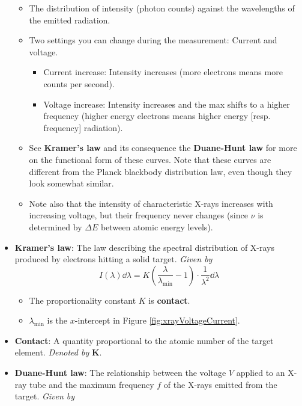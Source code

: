 \documentclass[../notes.tex]{subfiles}
\begin{document}
\begin{itemize}
\begin{itemize}
        \item The distribution of intensity (photon counts) against the wavelengths of the emitted radiation.
        \item Two settings you can change during the measurement: Current and voltage.
        \begin{itemize}
            \item Current increase: Intensity increases (more electrons means more counts per second).
            \item Voltage increase: Intensity increases and the max shifts to a higher frequency (higher energy electrons means higher energy [resp. frequency] radiation).
        \end{itemize}
        \item See \textbf{Kramer's law} and its consequence the \textbf{Duane-Hunt law} for more on the functional form of these curves. Note that these curves are different from the Planck blackbody distribution law, even though they look somewhat similar.
        \item Note also that the intensity of characteristic X-rays increases with increasing voltage, but their frequency never changes (since $\nu$ is determined by $\Delta E$ between atomic energy levels).
    \end{itemize}
    \item \textbf{Kramer's law}: The law describing the spectral distribution of X-rays produced by electrons hitting a solid target. \emph{Given by}
    \begin{equation*}
        I(\lambda)\dd\lambda = K\left( \frac{\lambda}{\lambda_\text{min}}-1 \right)\cdot\frac{1}{\lambda^2}\dd\lambda
    \end{equation*}
    \begin{itemize}
        \item The proportionality constant $K$ is \textbf{contact}.
        \item $\lambda_\text{min}$ is the $x$-intercept in Figure \ref{fig:xrayVoltageCurrent}.
    \end{itemize}
    \pagebreak
    \item \textbf{Contact}: A quantity proportional to the atomic number of the target element. \emph{Denoted by} $\bm{K}$.
    \item \textbf{Duane-Hunt law}: The relationship between the voltage $V$ applied to an X-ray tube and the maximum frequency $f$ of the X-rays emitted from the target. \emph{Given by}
    \begin{equation*}

\end{equation*}
\end{itemize}
\end{document}
